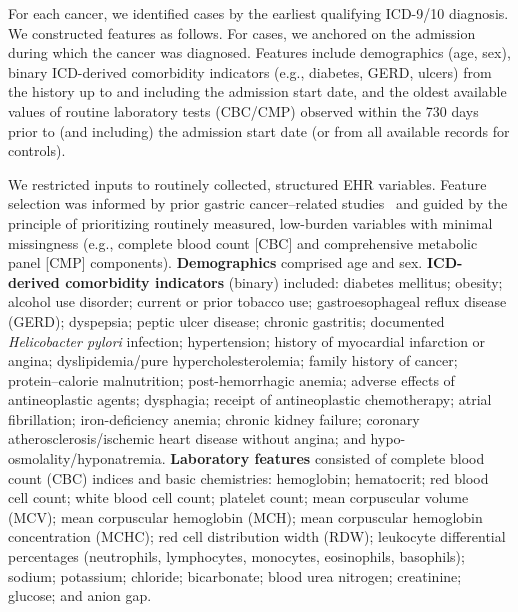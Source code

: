 \documentclass[diagnostics,article,submit,pdftex,moreauthors]{Definitions/mdpi}
\begin{document}

For each cancer, we identified cases by the earliest qualifying ICD-9/10 diagnosis.
We constructed features as follows.
For cases, we anchored on the admission during which the cancer was diagnosed.
Features include demographics (age, sex), binary ICD-derived comorbidity indicators (e.g., diabetes, GERD, ulcers) from the history up to and including the admission start date, and the oldest available values of routine laboratory tests (CBC/CMP) observed within the 730 days prior to (and including) the admission start date (or from all available records for controls).

We restricted inputs to routinely collected, structured EHR variables.
Feature selection was informed by prior gastric cancer–related studies~\citep{park2024SHapley,huang2022jco,Kim2024EHRGC} 
and guided by the principle of prioritizing routinely measured, low-burden variables with minimal missingness 
(e.g., complete blood count [CBC] and comprehensive metabolic panel [CMP] components).
\textbf{Demographics} comprised age and sex. 
\textbf{ICD-derived comorbidity indicators} (binary) included: diabetes mellitus; obesity; alcohol use disorder; current or prior tobacco use; gastroesophageal reflux disease (GERD); dyspepsia; peptic ulcer disease; chronic gastritis; documented \textit{Helicobacter pylori} infection; hypertension; history of myocardial infarction or angina; dyslipidemia/pure hypercholesterolemia; family history of cancer; protein–calorie malnutrition; post-hemorrhagic anemia; adverse effects of antineoplastic agents; dysphagia; receipt of antineoplastic chemotherapy; atrial fibrillation; iron-deficiency anemia; chronic kidney failure; coronary atherosclerosis/ischemic heart disease without angina; and hypo-osmolality/hyponatremia. 
\textbf{Laboratory features} consisted of complete blood count (CBC) indices and basic chemistries: hemoglobin; hematocrit; red blood cell count; white blood cell count; platelet count; mean corpuscular volume (MCV); mean corpuscular hemoglobin (MCH); mean corpuscular hemoglobin concentration (MCHC); red cell distribution width (RDW); leukocyte differential percentages (neutrophils, lymphocytes, monocytes, eosinophils, basophils); sodium; potassium; chloride; bicarbonate; blood urea nitrogen; creatinine; glucose; and anion gap. 

\end{document}
